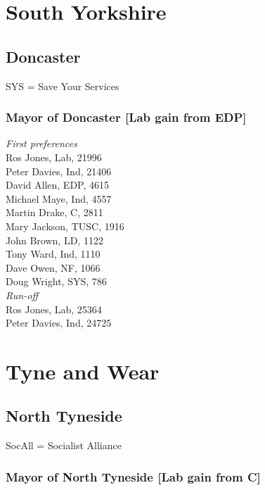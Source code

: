 \documentclass[a4paper,openany,10pt]{book}
\begin{document}
\chapter{South Yorkshire}

\section{Doncaster}

SYS = Save Your Services

\subsection*{Mayor of Doncaster \hspace*{\fill}\nolinebreak[1]%
\enspace\hspace*{\fill}
[Lab gain from EDP]}



\emph{First preferences}\\
Ros Jones, Lab, 21996\\
Peter Davies, Ind, 21406\\
David Allen, EDP, 4615\\
Michael Maye, Ind, 4557\\
Martin Drake, C, 2811\\
Mary Jackson, TUSC, 1916\\
John Brown, LD, 1122\\
Tony Ward, Ind, 1110\\
Dave Owen, NF, 1066\\
Doug Wright, SYS, 786\\




\emph{Run-off}\\
Ros Jones, Lab, 25364\\
Peter Davies, Ind, 24725\\


\chapter{Tyne and Wear}

\section{North Tyneside}

SocAll = Socialist Alliance

\subsection*{Mayor of North Tyneside \hspace*{\fill}\nolinebreak[1]%
\enspace\hspace*{\fill}
[Lab gain from C]}
\end{document}
